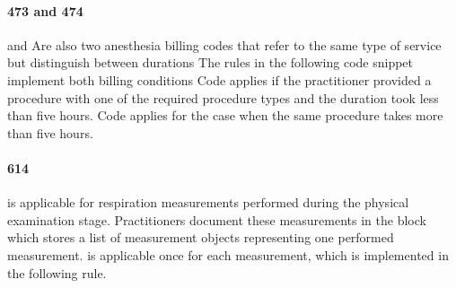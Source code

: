 \paragraph{473 and 474}
and
Are also two anesthesia billing codes that refer to the same type of service but distinguish between durations
The rules in the following code snippet implement both billing conditions
Code  applies if the practitioner provided a  procedure with one of the required procedure types and the duration took less than five hours.
Code  applies for the case when the same procedure takes more than five hours.



\paragraph{614}
 is applicable for respiration measurements performed during the physical examination stage.
Practitioners document these measurements in the  block which stores a list of measurement objects representing one performed measurement.
 is applicable once for each measurement, which is implemented in the following rule.


